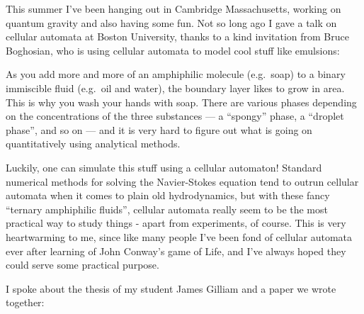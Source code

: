 \documentclass{article}
\def\tightlist{}
\renewcommand{\texttt}[1]{%
  \begingroup
  \ttfamily
  \begingroup\lccode`~=`/\lowercase{\endgroup\def~}{/\discretionary{}{}{}}%
  \begingroup\lccode`~=`[\lowercase{\endgroup\def~}{[\discretionary{}{}{}}%
  \begingroup\lccode`~=`.\lowercase{\endgroup\def~}{.\discretionary{}{}{}}%
  \catcode`/=\active\catcode`[=\active\catcode`.=\active
  \scantokens{#1\noexpand}%
  \endgroup
}
\begin{document}
This summer I've been hanging out in Cambridge Massachusetts, working on
quantum gravity and also having some fun. Not so long ago I gave a talk
on cellular automata at Boston University, thanks to a kind invitation
from Bruce Boghosian, who is using cellular automata to model cool stuff
like emulsions:


As you add more and more of an amphiphilic molecule (e.g.~soap) to a
binary immiscible fluid (e.g.~oil and water), the boundary layer likes
to grow in area. This is why you wash your hands with soap. There are
various phases depending on the concentrations of the three substances
--- a ``spongy'' phase, a ``droplet phase'', and so on --- and it is
very hard to figure out what is going on quantitatively using analytical
methods.

Luckily, one can simulate this stuff using a cellular automaton!
Standard numerical methods for solving the Navier-Stokes equation tend
to outrun cellular automata when it comes to plain old hydrodynamics,
but with these fancy ``ternary amphiphilic fluids'', cellular automata
really seem to be the most practical way to study things - apart from
experiments, of course. This is very heartwarming to me, since like many
people I've been fond of cellular automata ever after learning of John
Conway's game of Life, and I've always hoped they could serve some
practical purpose.

I spoke about the thesis of my student James Gilliam and a paper we
wrote together:

\end{document}
